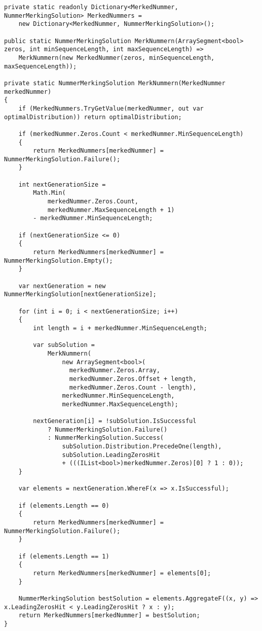 \documentclass[12pt]{article}
\begin{document}
\begin{lstlisting}
private static readonly Dictionary<MerkedNummer, NummerMerkingSolution> MerkedNummers =
    new Dictionary<MerkedNummer, NummerMerkingSolution>();

public static NummerMerkingSolution MerkNummern(ArraySegment<bool> zeros, int minSequenceLength, int maxSequenceLength) =>
    MerkNummern(new MerkedNummer(zeros, minSequenceLength, maxSequenceLength));

private static NummerMerkingSolution MerkNummern(MerkedNummer merkedNummer)
{
    if (MerkedNummers.TryGetValue(merkedNummer, out var optimalDistribution)) return optimalDistribution;

    if (merkedNummer.Zeros.Count < merkedNummer.MinSequenceLength)
    {
        return MerkedNummers[merkedNummer] = NummerMerkingSolution.Failure();
    }

    int nextGenerationSize =
        Math.Min(
            merkedNummer.Zeros.Count,
            merkedNummer.MaxSequenceLength + 1)
        - merkedNummer.MinSequenceLength;

    if (nextGenerationSize <= 0)
    {
        return MerkedNummers[merkedNummer] = NummerMerkingSolution.Empty();
    }

    var nextGeneration = new NummerMerkingSolution[nextGenerationSize];

    for (int i = 0; i < nextGenerationSize; i++)
    {
        int length = i + merkedNummer.MinSequenceLength;

        var subSolution =
            MerkNummern(
                new ArraySegment<bool>(
                  merkedNummer.Zeros.Array,
                  merkedNummer.Zeros.Offset + length,
                  merkedNummer.Zeros.Count - length),
                merkedNummer.MinSequenceLength,
                merkedNummer.MaxSequenceLength);

        nextGeneration[i] = !subSolution.IsSuccessful
            ? NummerMerkingSolution.Failure()
            : NummerMerkingSolution.Success(
                subSolution.Distribution.PrecedeOne(length),
                subSolution.LeadingZerosHit
                + (((IList<bool>)merkedNummer.Zeros)[0] ? 1 : 0));
    }

    var elements = nextGeneration.WhereF(x => x.IsSuccessful);

    if (elements.Length == 0)
    {
        return MerkedNummers[merkedNummer] = NummerMerkingSolution.Failure();
    }

    if (elements.Length == 1)
    {
        return MerkedNummers[merkedNummer] = elements[0];
    }

    NummerMerkingSolution bestSolution = elements.AggregateF((x, y) => x.LeadingZerosHit < y.LeadingZerosHit ? x : y);
    return MerkedNummers[merkedNummer] = bestSolution;
}
\end{lstlisting}
\end{document}
